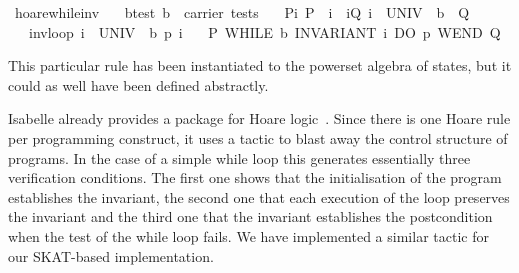 \documentclass{llncs}
\begin{document}
\begin{isabellebody}
\isanewline
{}\isamarkupfalse%
\ hoare{}while{}inv{}\isanewline
\ \ \ b{}test{}\ {}b\ {}\ carrier\ tests{}\isanewline
\ \ \ Pi{}\ {}P\ {}\ i{}\ \ iQ{}\ {}i\ {}\ {}UNIV\ {}\ {}b{}\ {}\ Q{}\isanewline
\ \ \ inv{}loop{}\ {}{}i\ {}\ {}UNIV\ {}\ b{}{}\ p\ {}i{}{}\isanewline
\ \ \ {}{}P{}\ WHILE\ b\ INVARIANT\ i\ DO\ p\ WEND\ {}Q{}{}\isanewline
\end{isabellebody}

\noindent This particular rule has been instantiated to the powerset
algebra of states, but it could as well have been defined abstractly.

Isabelle already provides a package for Hoare logic~\cite{Schirmer}. Since
there is one Hoare rule per programming construct, it uses a tactic to
blast away the control structure of programs. In the case of a simple
while loop this generates essentially three verification
conditions. The first one shows that the initialisation of the program
establishes the invariant, the second one that each execution of the
loop preserves the invariant and the third one that the invariant
establishes the postcondition when the test of the while loop
fails. We have implemented a similar tactic for our SKAT-based
implementation.
\end{document}
